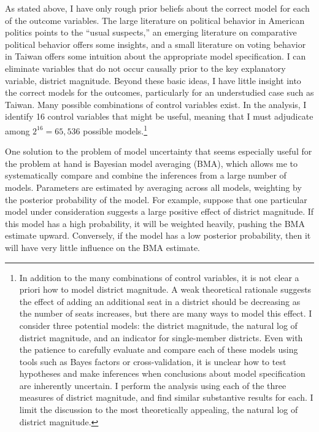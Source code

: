 \documentclass[12pt]{article}
\begin{document}
As stated above, I have only rough prior beliefs about the correct model for each of the outcome variables. The large literature on political behavior in American politics points to the ``usual suspects,'' an emerging literature on comparative political behavior offers some insights, and a small literature on voting behavior in Taiwan offers some intuition about the appropriate model specification. I can eliminate variables that do not occur causally prior to the key explanatory variable, district magnitude. Beyond these basic ideas, I have little insight into the correct models for the outcomes, particularly for an understudied case such as Taiwan. Many possible combinations of control variables exist. In the analysis, I identify 16 control variables that might be useful, meaning that I must adjudicate among $2^{16} = 65,536$ possible models.\footnote{In addition to the many combinations of control variables, it is not clear a priori how to model district magnitude. A weak theoretical rationale suggests the effect of adding an additional seat in a district should be decreasing as the number of seats increases, but there are many ways to model this effect. I consider three potential models: the district magnitude, the natural log of district magnitude, and an indicator for single-member districts. Even with the patience to carefully evaluate and compare each of these models using tools such as Bayes factors or cross-validation, it is unclear how to test hypotheses and make inferences when conclusions about model specification are inherently uncertain. I perform the analysis using each of the three measures of district magnitude, and find similar substantive results for each. I limit the discussion to the most theoretically appealing, the natural log of district magnitude.}

One solution to the problem of model uncertainty that seems especially useful for the problem at hand is Bayesian model averaging (BMA), which allows me to systematically compare and combine the inferences from a large number of models. Parameters are estimated by averaging across all models, weighting by the posterior probability of the model. For example, suppose that one particular model under consideration suggests a large positive effect of district magnitude. If this model has a high probability, it will be weighted heavily, pushing the BMA estimate upward. Conversely, if the model has a low posterior probability, then it will have very little influence on the BMA estimate. 
\end{document}

